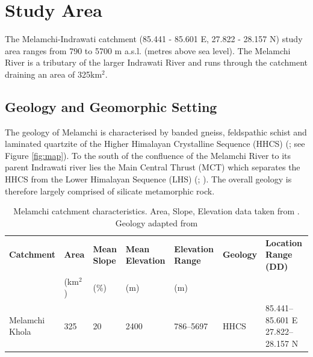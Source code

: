 
\section{Study Area}



The Melamchi-Indrawati catchment (85.441 - 85.601 E, 27.822 - 28.157 N) study area ranges from 790 to 5700 m a.s.l. (metres above sea level). The Melamchi River is a tributary of the larger Indrawati River and runs through the catchment draining an area of 325km${^2}$. 

\subsection{Geology and Geomorphic Setting}


The geology of Melamchi is characterised by banded gneiss, feldspathic schist and laminated quartzite of the Higher Himalayan Crystalline Sequence (HHCS) (\cite{dhitalGeologyNepalHimalaya2015}; see Figure \ref{fig:map}). To the south of the confluence of the Melamchi River to its parent Indrawati river lies the Main Central Thrust (MCT) which separates the HHCS from the Lower Himalayan Sequence (LHS) (\cite{dhitalGeologyNepalHimalaya2015}; \cite{grafGeomorphologicalHydrologicalControls2023}). The overall geology is therefore largely comprised of silicate metamorphic rock.


\begin{table}[h!]
    \centering
    \begin{small}
    \begin{tabular}{p{3cm} p{1cm} p{1cm} p{1.8cm} p{1.9cm} p{1.5cm} p{3cm}}
           \hline
           \textbf{Catchment} & \textbf{Area} & \textbf{Mean Slope} & \textbf{Mean Elevation} & \textbf{Elevation Range} & \textbf{Geology} & \textbf{Location Range (DD)} \\[4pt]
                              & (km$^2$)    & (\%)                & (m)                     & (m)                      &                &  \\[4pt]
           \hline
           Melamchi Khola     & 325         & 20                  & 2400                    & 786--5697                & HHCS           & 85.441--85.601 E  27.822--28.157 \phantom{h} N \\[4pt]
           \hline
    \end{tabular}
    \end{small}
    \caption{Melamchi catchment characteristics. Area, Slope, Elevation data taken from \cite{asterGlobalDigitalElevation2018}. Geology adapted from \cite{dhitalGeologyNepalHimalaya2015}}
    \label{tab:catchment_characteristics}
    \end{table}
    



